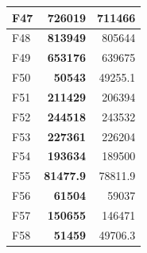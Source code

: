 \begin{table}[]
\begin{tabular}{lrr|}
\multicolumn{1}{|l|}{\cellcolor[HTML]{FCE6AB}F47} & \multicolumn{1}{r|}{\cellcolor[HTML]{D3FFB6}\textbf{726019}}  & 711466                                                    \\ \hline
\multicolumn{1}{|l|}{\cellcolor[HTML]{FCE6AB}F48} & \multicolumn{1}{r|}{\cellcolor[HTML]{D3FFB6}\textbf{813949}}  & 805644                                                    \\ \hline
\multicolumn{1}{|l|}{\cellcolor[HTML]{FCE6AB}F49} & \multicolumn{1}{r|}{\cellcolor[HTML]{D3FFB6}\textbf{653176}}  & 639675                                                    \\ \hline
\multicolumn{1}{|l|}{\cellcolor[HTML]{FCE6AB}F50} & \multicolumn{1}{r|}{\cellcolor[HTML]{D3FFB6}\textbf{50543}}   & 49255.1                                                   \\ \hline
\multicolumn{1}{|l|}{\cellcolor[HTML]{FCE6AB}F51} & \multicolumn{1}{r|}{\cellcolor[HTML]{D3FFB6}\textbf{211429}}  & 206394                                                    \\ \hline
\multicolumn{1}{|l|}{\cellcolor[HTML]{FCE6AB}F52} & \multicolumn{1}{r|}{\cellcolor[HTML]{D3FFB6}\textbf{244518}}  & 243532                                                    \\ \hline
\multicolumn{1}{|l|}{\cellcolor[HTML]{FCE6AB}F53} & \multicolumn{1}{r|}{\cellcolor[HTML]{D3FFB6}\textbf{227361}}  & 226204                                                    \\ \hline
\multicolumn{1}{|l|}{\cellcolor[HTML]{FCE6AB}F54} & \multicolumn{1}{r|}{\cellcolor[HTML]{D3FFB6}\textbf{193634}}  & 189500                                                    \\ \hline
\multicolumn{1}{|l|}{\cellcolor[HTML]{FCE6AB}F55} & \multicolumn{1}{r|}{\cellcolor[HTML]{D3FFB6}\textbf{81477.9}} & 78811.9                                                   \\ \hline
\multicolumn{1}{|l|}{\cellcolor[HTML]{FCE6AB}F56} & \multicolumn{1}{r|}{\cellcolor[HTML]{D3FFB6}\textbf{61504}}   & 59037                                                     \\ \hline
\multicolumn{1}{|l|}{\cellcolor[HTML]{FCE6AB}F57} & \multicolumn{1}{r|}{\cellcolor[HTML]{D3FFB6}\textbf{150655}}  & 146471                                                    \\ \hline
\multicolumn{1}{|l|}{\cellcolor[HTML]{FCE6AB}F58} & \multicolumn{1}{r|}{\cellcolor[HTML]{D3FFB6}\textbf{51459}}   & 49706.3                                                   \\ \hline

\end{tabular}
\end{table}
